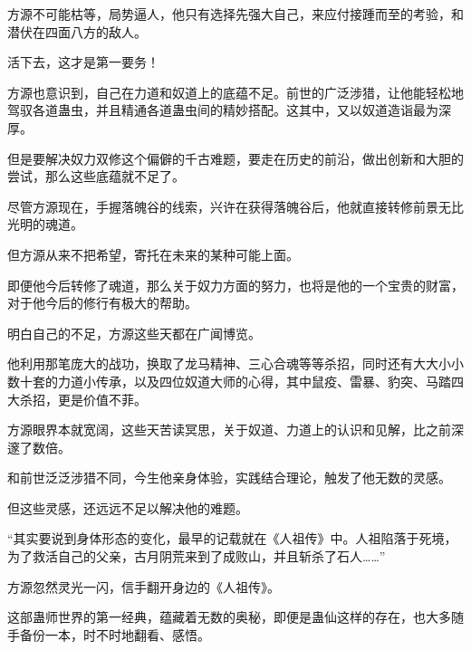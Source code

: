\begin{this_body}
方源不可能枯等，局势逼人，他只有选择先强大自己，来应付接踵而至的考验，和潜伏在四面八方的敌人。

活下去，这才是第一要务！

方源也意识到，自己在力道和奴道上的底蕴不足。前世的广泛涉猎，让他能轻松地驾驭各道蛊虫，并且精通各道蛊虫间的精妙搭配。这其中，又以奴道造诣最为深厚。

但是要解决奴力双修这个偏僻的千古难题，要走在历史的前沿，做出创新和大胆的尝试，那么这些底蕴就不足了。

尽管方源现在，手握落魄谷的线索，兴许在获得落魄谷后，他就直接转修前景无比光明的魂道。

但方源从来不把希望，寄托在未来的某种可能上面。

即便他今后转修了魂道，那么关于奴力方面的努力，也将是他的一个宝贵的财富，对于他今后的修行有极大的帮助。

明白自己的不足，方源这些天都在广闻博览。

他利用那笔庞大的战功，换取了龙马精神、三心合魂等等杀招，同时还有大大小小数十套的力道小传承，以及四位奴道大师的心得，其中鼠疫、雷暴、豹突、马踏四大杀招，更是价值不菲。

方源眼界本就宽阔，这些天苦读冥思，关于奴道、力道上的认识和见解，比之前深邃了数倍。

和前世泛泛涉猎不同，今生他亲身体验，实践结合理论，触发了他无数的灵感。

但这些灵感，还远远不足以解决他的难题。

“其实要说到身体形态的变化，最早的记载就在《人祖传》中。人祖陷落于死境，为了救活自己的父亲，古月阴荒来到了成败山，并且斩杀了石人……”

方源忽然灵光一闪，信手翻开身边的《人祖传》。

这部蛊师世界的第一经典，蕴藏着无数的奥秘，即便是蛊仙这样的存在，也大多随手备份一本，时不时地翻看、感悟。

\end{this_body}

